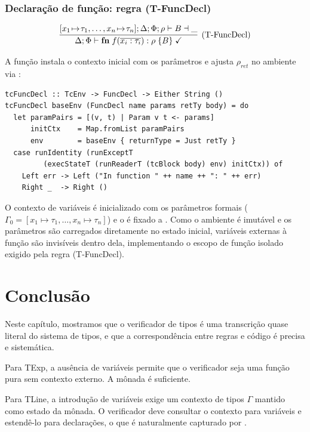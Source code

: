 \subsubsection{Declaração de função: regra (T-FuncDecl)}

\[
  \infer[\text{(T-FuncDecl)}]
  {\Delta;\Phi \vdash \mathbf{fn}\; f(\overline{x_i:\tau_i}):\rho\;\{B\}
  \;\checkmark}
  {[x_1\!\mapsto\!\tau_1,\ldots,x_n\!\mapsto\!\tau_n];\Delta;\Phi;\rho
  \vdash B \dashv \_}
\]

A função  instala o contexto inicial com os
parâmetros e ajusta \(\rho_{\mathit{ret}}\) no ambiente via
:

\begin{verbatim}
tcFuncDecl :: TcEnv -> FuncDecl -> Either String ()
tcFuncDecl baseEnv (FuncDecl name params retTy body) = do
  let paramPairs = [(v, t) | Param v t <- params]
      initCtx    = Map.fromList paramPairs
      env        = baseEnv { returnType = Just retTy }
  case runIdentity (runExceptT
         (execStateT (runReaderT (tcBlock body) env) initCtx)) of
    Left err -> Left ("In function " ++ name ++ ": " ++ err)
    Right _  -> Right ()
\end{verbatim}

O contexto de variáveis é inicializado com os parâmetros formais
(\(\Gamma_0 = [x_1\mapsto\tau_1,\ldots,x_n\mapsto\tau_n]\)) e o
 é fixado a . Como o ambiente
é imutável e os parâmetros são carregados diretamente no estado
inicial, variáveis externas à função são invisíveis dentro dela,
implementando o escopo de função isolado exigido pela regra (T-FuncDecl).

\section{Conclusão}

Neste capítulo, mostramos que o verificador de tipos é uma
transcrição quase literal do sistema de tipos, e que a
correspondência entre regras e código é precisa e sistemática.

Para TExp, a ausência de variáveis permite que o verificador seja uma
função pura sem contexto externo. A mônada
 é suficiente.

Para TLine, a introdução de variáveis exige um contexto de tipos
\(\Gamma\) mantido como estado da mônada. O verificador deve
consultar o contexto para variáveis e estendê-lo para declarações, o
que é naturalmente capturado por
.

